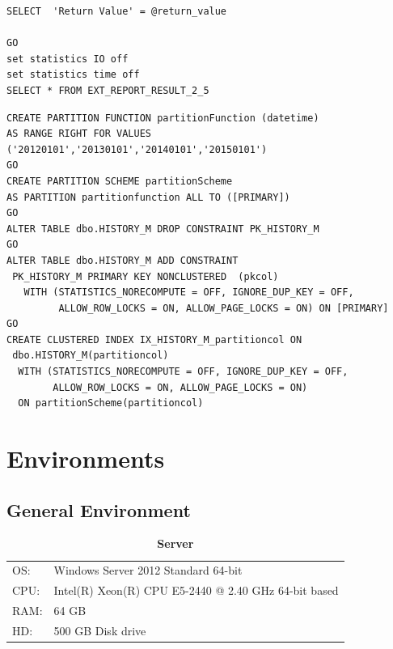 \documentclass{cslthse-msc}
\begin{document}
\begin{appendices}
\begin{lstlisting}[caption={SQL batch to execute stored procedure report\_2\_5},label=spexec]
SELECT	'Return Value' = @return_value

GO
set statistics IO off
set statistics time off
SELECT * FROM EXT_REPORT_RESULT_2_5
\end{lstlisting}

\newpage
\begin{lstlisting}[caption={SQL batch to create a partitioned table out of an already existing table},label=partitionex]
CREATE PARTITION FUNCTION partitionFunction (datetime)
AS RANGE RIGHT FOR VALUES ('20120101','20130101','20140101','20150101')
GO
CREATE PARTITION SCHEME partitionScheme 
AS PARTITION partitionfunction ALL TO ([PRIMARY]) 
GO
ALTER TABLE dbo.HISTORY_M DROP CONSTRAINT PK_HISTORY_M
GO
ALTER TABLE dbo.HISTORY_M ADD CONSTRAINT
 PK_HISTORY_M PRIMARY KEY NONCLUSTERED  (pkcol)
   WITH (STATISTICS_NORECOMPUTE = OFF, IGNORE_DUP_KEY = OFF, 
         ALLOW_ROW_LOCKS = ON, ALLOW_PAGE_LOCKS = ON) ON [PRIMARY]
GO
CREATE CLUSTERED INDEX IX_HISTORY_M_partitioncol ON
 dbo.HISTORY_M(partitioncol)
  WITH (STATISTICS_NORECOMPUTE = OFF, IGNORE_DUP_KEY = OFF, 
        ALLOW_ROW_LOCKS = ON, ALLOW_PAGE_LOCKS = ON) 
  ON partitionScheme(partitioncol)

\end{lstlisting}



\chapter{Environments}
\section{General Environment}\label{sec:Genviron}
\begin{table}[H]
\begin{center}
\caption*{\textbf{Server}}
\begin{tabular}{l l}
OS: & Windows Server 2012 Standard 64-bit\\
CPU: & Intel(R) Xeon(R) CPU E5-2440 @ 2.40 GHz 64-bit based\\
RAM: & 64 GB \\
HD: & 500 GB Disk drive
\end{tabular}
\end{center}
\end{table}


\end{appendices}
\end{document}
